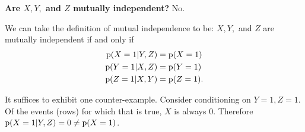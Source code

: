 \documentclass{article}
\begin{document}
\begin{enumerate}[label=(\alph*)]
    \begin{mdframed}
      \textbf{Are $X, Y,$ and $Z$ mutually independent?} No.

      We can take the definition of mutual independence to be: $X, Y,$ and $Z$
      are mutually independent if and only if
      \begin{align*}
        \operatorname{\text{p}}(X=1|Y,Z) &= \operatorname{\text{p}}(X=1)\\
        \operatorname{\text{p}}(Y=1|X,Z) &= \operatorname{\text{p}}(Y=1)\\
        \operatorname{\text{p}}(Z=1|X,Y) &= \operatorname{\text{p}}(Z=1).
      \end{align*}

      It suffices to exhibit one counter-example. Consider conditioning on
      $Y=1,Z=1$. Of the events (rows) for which that is true, $X$ is always
      0. Therefore $\operatorname{\text{p}}(X=1|Y,Z) = 0 \neq \operatorname{\text{p}}(X=1)$.

    \end{mdframed}

\end{enumerate}

\newpage
\end{document}
